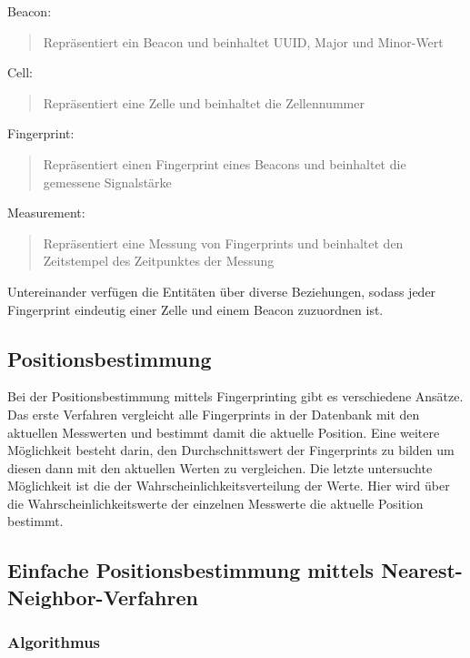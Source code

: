 Beacon:
	\begin{quote}Repräsentiert ein Beacon und beinhaltet UUID, Major und Minor-Wert\end{quote}
Cell:
	\begin{quote}Repräsentiert eine Zelle und beinhaltet die Zellennummer\end{quote}
Fingerprint:
	\begin{quote}Repräsentiert einen Fingerprint eines Beacons und beinhaltet die gemessene Signalstärke\end{quote}
Measurement:
	\begin{quote}Repräsentiert eine Messung von Fingerprints und beinhaltet den Zeitstempel des Zeitpunktes der Messung\end{quote}

Untereinander verfügen die Entitäten über diverse Beziehungen, sodass jeder Fingerprint eindeutig einer Zelle und einem Beacon zuzuordnen ist.

\subsection{Positionsbestimmung}
\label{sec:implementation:fingerprinting:positioning}
Bei der Positionsbestimmung mittels Fingerprinting gibt es verschiedene Ansätze.
Das erste Verfahren vergleicht alle Fingerprints in der Datenbank mit den aktuellen Messwerten und bestimmt damit die aktuelle Position.
Eine weitere Möglichkeit besteht darin, den Durchschnittswert der Fingerprints zu bilden um diesen dann mit den aktuellen Werten zu vergleichen.
Die letzte untersuchte Möglichkeit ist die der Wahrscheinlichkeitsverteilung der Werte. Hier wird über die Wahrscheinlichkeitswerte der einzelnen Messwerte die aktuelle Position bestimmt.

\subsection{Einfache Positionsbestimmung mittels Nearest-Neighbor-Verfahren}
\label{sec:implementation:fingerprinting:positioning:naiv}

\subsubsection{Algorithmus}
\label{sec:implementation:fingerprinting:positioning:naiv:algorithm}

